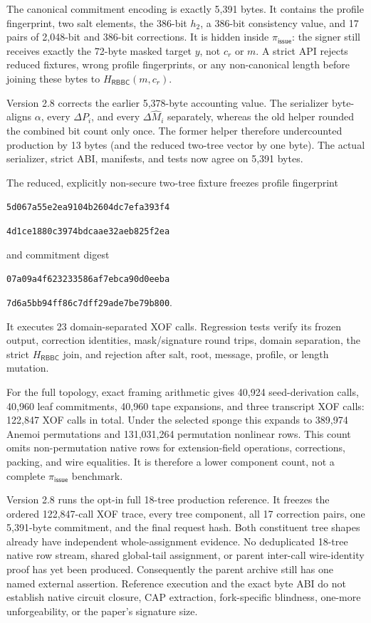 \documentclass[11pt]{article}
\newcommand{\RBBC}{\mathsf{RBBC}}
\begin{document}
The canonical commitment encoding is exactly 5,391 bytes.  It contains the
profile fingerprint, two salt elements, the 386-bit $h_2$, a 386-bit
consistency value, and 17 pairs of 2,048-bit and 386-bit corrections.  It is
hidden inside $\pi_{\mathsf{issue}}$: the signer still receives exactly the
72-byte masked target $y$, not $c_r$ or $m$.  A strict API rejects reduced
fixtures, wrong profile fingerprints, or any non-canonical length before
joining these bytes to $H_{\RBBC}(m,c_r)$.

Version 2.8 corrects the earlier 5,378-byte accounting value.  The serializer
byte-aligns $\alpha$, every $\Delta P_i$, and every
$\Delta\widehat M_i$ separately, whereas the old helper rounded the combined
bit count only once.  The former helper therefore undercounted production by
13 bytes (and the reduced two-tree vector by one byte).  The actual serializer,
strict ABI, manifests, and tests now agree on 5,391 bytes.

The reduced, explicitly non-secure two-tree fixture freezes profile fingerprint
\begin{center}
\texttt{5d067a55e2ea9104b2604dc7efa393f4}\par\vspace{-0.2em}
\texttt{4d1ce1880c3974bdcaae32aeb825f2ea}
\end{center}
and commitment digest
\begin{center}
\texttt{07a09a4f623233586af7ebca90d0eeba}\par\vspace{-0.2em}
\texttt{7d6a5bb94ff86c7dff29ade7be79b800}.
\end{center}
It executes 23 domain-separated XOF calls.  Regression tests verify its frozen
output, correction identities, mask/signature round trips, domain separation,
the strict $H_{\RBBC}$ join, and rejection after salt, root, message, profile,
or length mutation.

For the full topology, exact framing arithmetic gives 40,924 seed-derivation
calls, 40,960 leaf commitments, 40,960 tape expansions, and three transcript
XOF calls: 122,847 XOF calls in total.  Under the selected sponge this expands
to 389,974 Anemoi permutations and 131,031,264 permutation nonlinear rows.
This count omits non-permutation native rows for extension-field operations,
corrections, packing, and wire equalities.  It is therefore a lower component
count, not a complete $\pi_{\mathsf{issue}}$ benchmark.

Version 2.8 runs the opt-in full 18-tree production reference.  It freezes the
ordered 122,847-call XOF trace, every tree component, all 17 correction pairs,
one 5,391-byte commitment, and the final request hash.  Both constituent tree
shapes already have independent whole-assignment evidence.  No deduplicated
18-tree native row stream, shared global-tail assignment, or parent inter-call
wire-identity proof has yet been produced.  Consequently the parent archive
still has one named external assertion.  Reference execution and the exact
byte ABI do not establish native circuit closure, CAP extraction, fork-specific
blindness, one-more unforgeability, or the paper's signature size.
\end{document}
